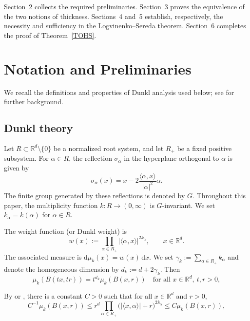 \documentclass[12pt]{article}
\begin{document}
Section~2 collects the required preliminaries. Section~3 proves the equivalence of the two notions of thickness. Sections~4 and~5 establish, respectively, the necessity and sufficiency in the Logvinenko--Sereda theorem. Section~6 completes the proof of Theorem~\ref{TOHS}.


\section{Notation and Preliminaries}


We recall the definitions and properties of Dunkl analysis used below; see \cite{MFE1,MR1,ST1,JDA1} for further background.

\subsection{Dunkl theory}

Let $R \subset \mathbb{R}^d \setminus \{0\}$ be a normalized root system, and let $R_+$ be a fixed positive subsystem. For $\alpha \in R$, the reflection $\sigma_\alpha$ in the hyperplane orthogonal to $\alpha$ is given by
\[
\sigma_\alpha(x) = x - 2\frac{\langle \alpha,x\rangle}{|\alpha|^2}\alpha.
\]
The finite group generated by these reflections is denoted by $G$. Throughout this paper, the multiplicity function $k:R\to(0,\infty)$ is $G$-invariant. We set $k_\alpha = k(\alpha)$ for $\alpha \in R$.

The weight function (or Dunkl weight) is
\[
w(x) := \prod_{\alpha \in R_+} |\langle \alpha,x\rangle|^{2k_\alpha}, \qquad x \in \mathbb{R}^d.
\]
The associated measure is $\mathrm{d}\mu_k(x) = w(x)\,\mathrm{d}x$. We set $\gamma_k:=\sum_{\alpha\in R_+}k_\alpha$ and denote the homogeneous dimension by $d_k:=d+2\gamma_k$. Then
\[
\mu_k(B(tx, tr)) = t^{d_k} \mu_k(B(x, r)) \quad \text{for all } x\in\mathbb{R}^d,\ t,r>0,
\]

By \cite{JDA2} or \cite{JDA3}, there is a constant $C>0$ such that for all $x\in\mathbb{R}^d$ and $r>0$,
\begin{equation}\label{EWBOUND}
C^{-1} \mu_k(B(x,r))
\le r^{d} \prod_{\alpha\in R_+} \big(|\langle x,\alpha\rangle| + r\big)^{2k_\alpha}
\le C \mu_k(B(x,r)),
\end{equation}
\end{document}
